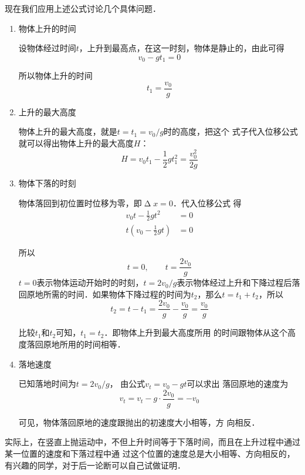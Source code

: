 现在我们应用上述公式讨论几个具体问题．
\begin{enumerate}[(1)]
    \item 物体上升的时间

          设物体经过时间$t$，上升到最高点，在这一时刻，物体是静止的，由此可得
          \[v_0-gt_1=0 \]

          所以物体上升的时间
          \[t_1=\frac{v_0}{g} \]

    \item 上升的最大高度

          物体上升的最大高度，就是$t=t_1=v_0/g$时的高度，把这个
          式子代入位移公式就可以得出物体上升的最大高度$H$：
          \[H=v_0t_1-\frac{1}{2}gt_1^2=\frac{v^2_0}{2g} \]

    \item 物体下落的时刻

          物体落回到初位置时位移为零，即$\upDelta x=0$．代入位移公式
          得
          \begin{equation*}
              \begin{aligned}
                  v_0 t-\frac{1}{2}gt^2           & =0 \\
                  t\left(v_0-\frac{1}{2}gt\right) & =0
              \end{aligned}
          \end{equation*}

          所以
          \[t=0,\qquad t=\frac{2v_0}{g} \]
          $t=0$表示物体运动开始时的时刻，$t=2v_0/g$表示物体经过上升和下降过程后落回原地所需的时间．如果物体下降过程的时间为$t_2$，那么$t=t_1+t_2$，所以
          \[t_2=t-t_1=\frac{2v_0}{g}-\frac{v_0}{g}=\frac{v_0}{g} \]

          比较$t_1$和$t_2$可知，$t_1=t_2$．即物体上升到最大高度所用
          的时间跟物体从这个高度落回原地所用的时间相等．

    \item 落地速度

          已知落地时间为$t=2v_0/g$，
          由公式$v_t=v_0-gt$可以求出
          落回原地的速度为
          \[v_t=v_t-g\cdot \frac{2v_0}{g}=-v_0 \]

          可见，物体落回原地的速度跟抛出的初速度大小相等，方
          向相反．
\end{enumerate}

实际上，在竖直上抛运动中，不但上升时间等于下落时间，而且在上升过程中通过某一位置的速度和下落过程中通
过这个位置的速度总是大小相等、方向相反的，有兴趣的同学，对于后一论断可以自己试做证明．

